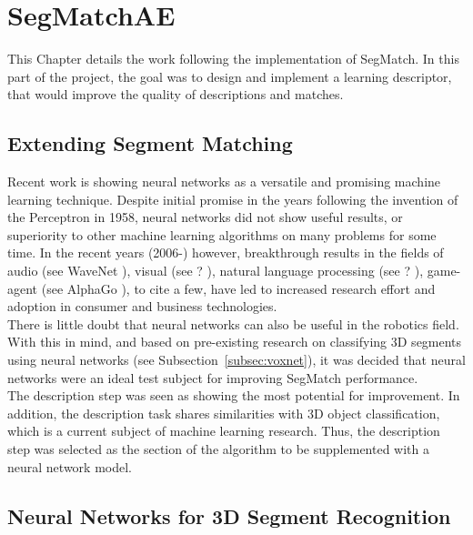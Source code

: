 \chapter{SegMatchAE}
\label{chap:ae}

This Chapter details the work following the implementation of SegMatch. In this part of the project, the goal was to design and implement a learning descriptor, that would improve the quality of descriptions and matches.\\

\section{Extending Segment Matching}
\label{sec:ae-intro}

Recent work is showing neural networks as a versatile and promising machine learning technique. Despite initial promise in the years following the invention of the Perceptron \cite{perceptron} in 1958, neural networks did not show useful results, or superiority to other machine learning algorithms on many problems for some time. In the recent years (2006-) however, breakthrough results in the fields of audio (see WaveNet \cite{wavenet}), visual (see ? \cite{inception?}), natural language processing (see ? \cite{?}), game-agent (see AlphaGo \cite{alphago}), to cite a few, have led to increased research effort and adoption in consumer \cite{snapchat-face-recognition} and business \cite{google-cooling} technologies.\\

There is little doubt that neural networks can also be useful in the robotics field. With this in mind, and based on pre-existing research on classifying 3D segments using neural networks (see Subsection~\ref{subsec:voxnet}), it was decided that neural networks were an ideal test subject for improving SegMatch performance.\\

The description step was seen as showing the most potential for improvement. In addition, the description task shares similarities with 3D object classification, which is a current subject of machine learning research. Thus, the description step was selected as the section of the algorithm to be supplemented with a neural network model.\\

\section{Neural Networks for 3D Segment Recognition}
\label{sec:neural-nets}

